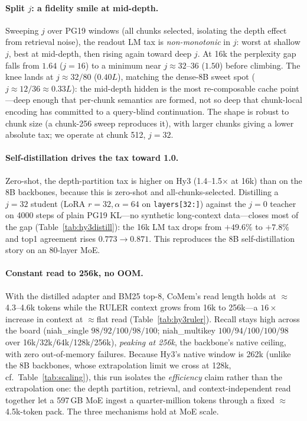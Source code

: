 \paragraph{Split $j$: a fidelity smile at mid-depth.} Sweeping $j$ over PG19
windows (all chunks selected, isolating the depth effect from retrieval noise),
the readout LM tax is \emph{non-monotonic} in $j$: worst at shallow $j$, best at
mid-depth, then rising again toward deep $j$. At 16k the perplexity gap falls
from $1.64$ ($j{=}16$) to a minimum near $j{\approx}32$--$36$ ($1.50$) before
climbing. The knee lands at $j{\approx}32/80$ ($0.40L$), matching the dense-8B
sweet spot ($j{\approx}12/36\approx0.33L$): the mid-depth hidden is the most
re-composable cache point---deep enough that per-chunk semantics are formed, not
so deep that chunk-local encoding has committed to a query-blind continuation.
The shape is robust to chunk size (a chunk-256 sweep reproduces it), with larger
chunks giving a lower absolute tax; we operate at chunk 512, $j{=}32$.

\paragraph{Self-distillation drives the tax toward 1.0.} Zero-shot, the
depth-partition tax is higher on Hy3 (1.4--1.5$\times$ at 16k) than on the 8B
backbones, because this is zero-shot and all-chunks-selected. Distilling a
$j{=}32$ student (LoRA $r{=}32,\alpha{=}64$ on \texttt{layers[32:]}) against the
$j{=}0$ teacher on 4000 steps of plain PG19 KL---no synthetic long-context
data---closes most of the gap (Table~\ref{tab:hy3distill}): the 16k LM tax drops
from $+49.6\%$ to $+7.8\%$ and top1 agreement rises $0.773\to0.871$. This
reproduces the 8B self-distillation story on an $80$-layer MoE.



\paragraph{Constant read to 256k, no OOM.} With the distilled adapter and BM25
top-8, CoMem's read length holds at $\approx$4.3--4.6k tokens while the RULER
context grows from 16k to 256k---a $16\times$ increase in context at
$\approx$flat read (Table~\ref{tab:hy3ruler}). Recall stays high across the
board (niah\_single $98/92/100/98/100$; niah\_multikey $100/94/100/100/98$ over
16k/32k/64k/128k/256k), \emph{peaking at 256k}, the backbone's native ceiling,
with zero out-of-memory failures. Because Hy3's native window is 262k (unlike
the 8B backbones, whose extrapolation limit we cross at 128k, cf.\
Table~\ref{tab:scaling}), this run isolates the \emph{efficiency} claim rather
than the extrapolation one: the depth partition, retrieval, and
context-independent read together let a 597\,GB MoE ingest a quarter-million
tokens through a fixed $\approx$4.5k-token pack. The three mechanisms hold at
MoE scale.



